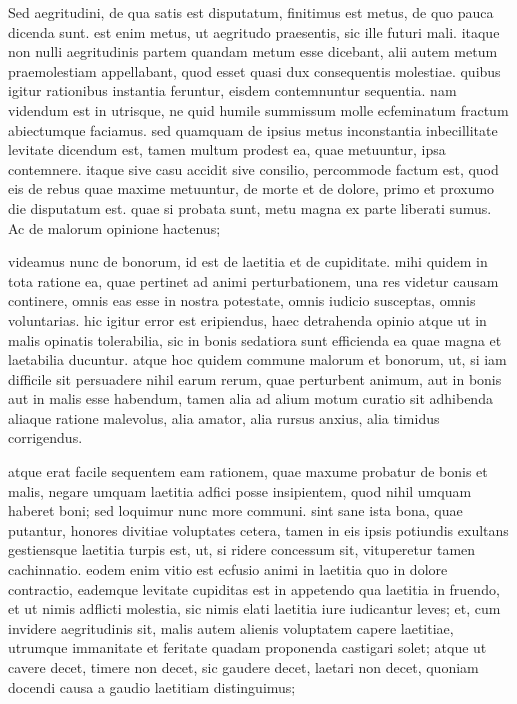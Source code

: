  Sed aegritudini, de qua satis est disputatum, finitimus est metus, de quo pauca dicenda sunt. est enim metus, ut aegritudo praesentis, sic ille futuri mali. itaque non nulli aegritudinis partem quandam metum esse dicebant, alii autem metum praemolestiam appellabant, quod esset quasi dux consequentis molestiae. quibus igitur rationibus instantia feruntur, eisdem contemnuntur sequentia. nam videndum est in utrisque, ne quid humile summissum molle ecfeminatum fractum abiectumque faciamus. sed quamquam de ipsius metus inconstantia inbecillitate levitate dicendum est, tamen multum prodest ea, quae metuuntur, ipsa contemnere. itaque sive casu accidit sive consilio, percommode factum est, quod eis de rebus quae maxime metuuntur, de morte et de dolore, primo et proxumo die disputatum est. quae si probata sunt, metu magna ex parte liberati sumus. Ac de malorum opinione hactenus;

 videamus nunc de bonorum, id est de laetitia et de cupiditate. mihi quidem in tota ratione ea, quae pertinet ad animi perturbationem, una res videtur causam continere, omnis eas esse in nostra potestate, omnis iudicio susceptas, omnis voluntarias. hic igitur error est eripiendus, haec detrahenda opinio atque ut in malis opinatis tolerabilia, sic in bonis sedatiora sunt efficienda ea quae magna et laetabilia ducuntur. atque hoc quidem commune malorum et bonorum, ut, si iam difficile sit persuadere nihil earum rerum, quae perturbent animum, aut in bonis aut in malis esse habendum, tamen alia ad alium motum curatio sit adhibenda aliaque ratione malevolus, alia amator, alia rursus anxius, alia timidus corrigendus.

 atque erat facile sequentem eam rationem, quae maxume probatur de bonis et malis, negare umquam laetitia adfici posse insipientem, quod nihil umquam haberet boni; sed loquimur nunc more communi. sint sane ista bona, quae putantur, honores divitiae voluptates cetera, tamen in eis ipsis potiundis exultans gestiensque laetitia turpis est, ut, si ridere concessum sit, vituperetur tamen cachinnatio. eodem enim vitio est ecfusio animi in laetitia quo in dolore contractio, eademque levitate cupiditas est in appetendo qua laetitia in fruendo, et ut nimis adflicti molestia, sic nimis elati laetitia iure iudicantur leves; et, cum invidere aegritudinis sit, malis autem alienis voluptatem capere laetitiae, utrumque immanitate et feritate quadam proponenda castigari solet; atque ut cavere decet, timere non decet, sic gaudere decet, laetari non decet, quoniam docendi causa a gaudio laetitiam distinguimus;

